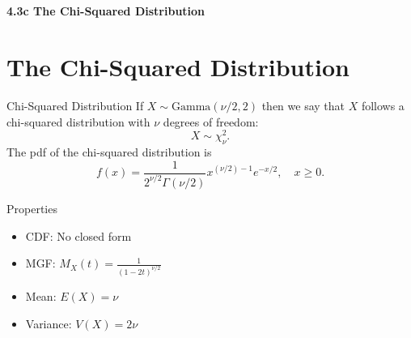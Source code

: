 \section{}

\begin{frame}
  \frametitle{}
  
  \begin{center}
    \Large{\textbf{4.3c The Chi-Squared Distribution}}
  \end{center}
  
  \bigskip
  
\end{frame}

\section{The Chi-Squared Distribution}

\begin{frame}
  \begin{block}{Chi-Squared Distribution}
    If $X \sim \mbox{Gamma}(\nu/2,2)$ then we say that $X$ follows a chi-squared distribution with $\nu$ degrees of freedom:
    \[
      X \sim \chi^2_\nu.
    \]
    The pdf of the chi-squared distribution is
    \[
      f(x)=\frac{1}{2^{\nu/2}\Gamma(\nu/2)}x^{(\nu/2)-1}e^{-x/2},\quad x \geq 0.
    \]
  \end{block}

  \vspace{-.1in}
  
  \begin{block}{Properties}
        \begin{itemize}
        \item CDF: No closed form

        \item MGF: $M_X(t)=\frac{1}{(1-2t)^{\nu/2}}$
          
        \item Mean: $E(X)=\nu$
      
        \item Variance: $V(X)=2\nu$


        \end{itemize}
\end{block}
\end{frame}

